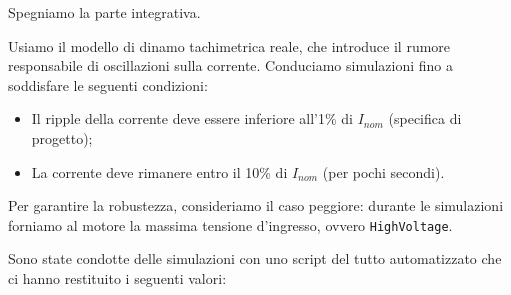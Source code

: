 \documentclass[a4paper,12pt]{article}
\begin{document}
Spegniamo la parte integrativa.

Usiamo il modello di dinamo tachimetrica reale, che introduce il rumore responsabile di oscillazioni sulla corrente. Conduciamo simulazioni fino a soddisfare le seguenti condizioni:

\begin{itemize}
    \item Il ripple della corrente deve essere inferiore all'1\% di $I_{nom}$ (specifica di progetto);
    \item La corrente deve rimanere entro il 10\% di $I_{nom}$ (per pochi secondi).
\end{itemize}

Per garantire la robustezza, consideriamo il caso peggiore: durante le simulazioni forniamo al motore la massima tensione d'ingresso, ovvero \texttt{HighVoltage}.

\vspace{0.5cm}

Sono state condotte delle simulazioni con uno script del tutto automatizzato che ci hanno restituito i seguenti valori:
\end{document}
